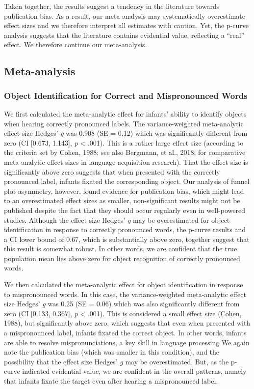 \documentclass[man]{apa6}
\theoremstyle{definition}
\theoremstyle{definition}
\theoremstyle{definition}
\theoremstyle{remark}
\begin{document}
Taken together, the results suggest a tendency in the literature towards
publication bias. As a result, our meta-analysis may systematically
overestimate effect sizes and we therefore interpret all estimates with
caution. Yet, the p-curve analysis suggests that the literature contains
evidential value, reflecting a \enquote{real} effect. We therefore
continue our meta-analysis.

\subsection{Meta-analysis}\label{meta-analysis-1}

\subsubsection{Object Identification for Correct and Mispronounced
Words}\label{object-identification-for-correct-and-mispronounced-words}

We first calculated the meta-analytic effect for infants' ability to
identify objects when hearing correctly pronounced labels. The
variance-weighted meta-analytic effect size Hedges' \emph{g} was 0.908
(SE = 0.12) which was significantly different from zero (CI {[}0.673,
1.143{]}, \emph{p} \textless{} .001). This is a rather large effect size
(according to the criteria set by Cohen, 1988; see also Bergmann, et
al., 2018; for comparative meta-analytic effect sizes in language
acquisition research). That the effect size is significantly above zero
suggests that when presented with the correctly pronounced label,
infants fixated the corresponding object. Our analysis of funnel plot
asymmetry, however, found evidence for publication bias, which might
lead to an overestimated effect sizes as smaller, non-significant
results might not be published despite the fact that they should occur
regularly even in well-powered studies. Although the effect size Hedges'
\emph{g} may be overestimated for object identification in response to
correctly pronounced words, the p-curve results and a CI lower bound of
0.67, which is substantially above zero, together suggest that this
result is somewhat robust. In other words, we are confident that the
true population mean lies above zero for object recognition of correctly
pronounced words.

We then calculated the meta-analytic effect for object identification in
response to mispronounced words. In this case, the variance-weighted
meta-analytic effect size Hedges' \emph{g} was 0.25 (SE = 0.06) which
was also significantly different from zero (CI {[}0.133, 0.367{]},
\emph{p} \textless{} .001). This is considered a small effect size
(Cohen, 1988), but significantly above zero, which suggests that even
when presented with a mispronounced label, infants fixated the correct
object. In other words, infants are able to resolve mispronunciations, a
key skill in language processing We again note the publication bias
(which was smaller in this condition), and the possibility that the
effect size Hedges' \emph{g} may be overestimated. But, as the p-curve
indicated evidential value, we are confident in the overall patterns,
namely that infants fixate the target even after hearing a mispronounced
label.
\end{document}
